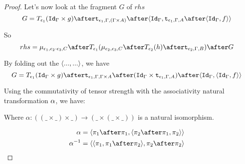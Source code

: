 \documentclass{report}
\begin{document}
\begin{framed}
\begin{proof}
        Let's now look at the fragment $G$ of $rhs$
        \begin{equation}
            G = \T{\e_1}{(\idg\times g)}\after\tstrength{\e_1}{\G}{(\G\times A)}\after\pr{\idg}{\tstrength{\e_1}{\G}{A}\after\pr{\idg}{f}}
        \end{equation}
        
        So
        \begin{equation}
            rhs = \bind{\e_1}{\e_2\dot\e_3}{C}\after\T{\e_1}{(\bind{\e_2}{\e_3}{C}\after \T{\e_2}{(h)} \after \tstrength{\e_2}{\G}{B})}\after G
        \end{equation}
        
        
        By folding out the $\langle..., ...\rangle$, we have
        \begin{equation}
            G = \T{\e_1}{(\idg\times g)}\after\tstrength{\e_1}{\G}{\G \times A}\after(\idg\times\tstrength{\e_1}{\G}{A})\after\pr{\idg}{\pr{\idg}{f}}
        \end{equation}
        
       Using the commutativity of tensor strength with the associativity natural transformation $\alpha$, we have:
        
        
        Where $\alpha: ((\_ \times \_) \times \_) \rightarrow (\_ \times (\_ \times \_))$ is a natural isomorphism.
        
        \begin{align*}
            \alpha & = \pr{\p\after\p}{\pr{\pp\after\p}{\pp}}\\
            \alpha^{-1} &= \pr{\pr{\p}{\p\after\pp}}{\pp\after\pp}
        \end{align*}
        

\end{proof}
\end{framed}
\end{document}
